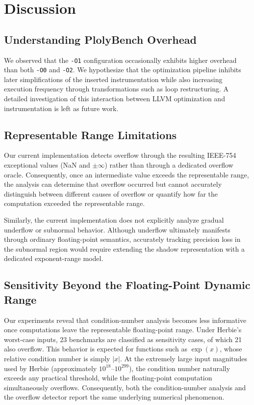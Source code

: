 \section{Discussion}

\subsection{Understanding PlolyBench Overhead}

We observed that the \texttt{-O1} configuration occasionally exhibits higher overhead than both \texttt{-O0} and \texttt{-O2}. We hypothesize that the optimization pipeline inhibits later simplifications of the inserted instrumentation while also increasing execution frequency through transformations such as loop restructuring. A detailed investigation of this interaction between LLVM optimization and instrumentation is left as future work.

\subsection{Representable Range Limitations}

Our current implementation detects overflow through the resulting IEEE-754 exceptional values (NaN and $\pm\infty$) rather than through a dedicated overflow oracle. Consequently, once an intermediate value exceeds the representable range, the analysis can determine that overflow occurred but cannot accurately distinguish between different causes of overflow or quantify how far the computation exceeded the representable range.

Similarly, the current implementation does not explicitly analyze gradual underflow or subnormal behavior. Although underflow ultimately manifests through ordinary floating-point semantics, accurately tracking precision loss in the subnormal region would require extending the shadow representation with a dedicated exponent-range model.

\subsection{Sensitivity Beyond the Floating-Point Dynamic Range}
\label{sec:disc_sensitivity}

Our experiments reveal that condition-number analysis becomes less informative once computations leave the representable floating-point range. Under Herbie's worst-case inputs, 23 benchmarks are classified as sensitivity cases, of which 21 also overflow. This behavior is expected for functions such as $\exp(x)$, whose relative condition number is simply $|x|$. At the extremely large input magnitudes used by Herbie (approximately $10^{18}$--$10^{299}$), the condition number naturally exceeds any practical threshold, while the floating-point computation simultaneously overflows. Consequently, both the condition-number analysis and the overflow detector report the same underlying numerical phenomenon. 

